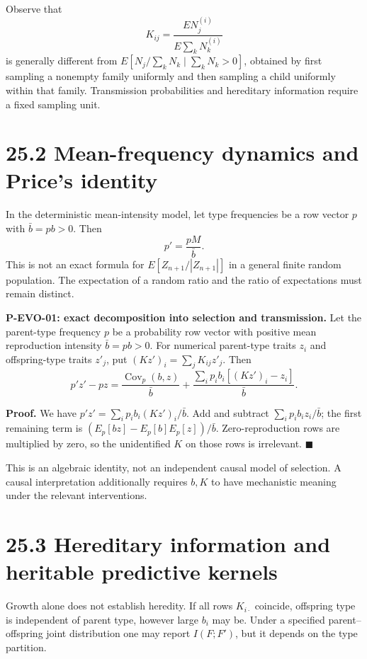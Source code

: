 \documentclass[
  english,
  11pt,
  oneside]{book}
\newcounter{none} %
\begin{document}
Observe that \[K_{ij}=\frac{EN_j^{(i)}}{E\sum_kN_k^{(i)}}\] is generally different from \(E[N_j/\sum_kN_k\mid\sum_kN_k>0]\), obtained by first sampling a nonempty family uniformly and then sampling a child uniformly within that family. Transmission probabilities and hereditary information require a fixed sampling unit.

\section{25.2 Mean-frequency dynamics and Price's identity}\label{mean-frequency-dynamics-and-prices-identity}

In the deterministic mean-intensity model, let type frequencies be a row vector \(p\) with \(\bar b=pb>0\). Then \[p'=\frac{pM}{\bar b}.\] This is not an exact formula for \(E[Z_{n+1}/|Z_{n+1}|]\) in a general finite random population. The expectation of a random ratio and the ratio of expectations must remain distinct.

\hypertarget{p-evo-01}{}\label{p-evo-01}

\textbf{P-EVO-01: exact decomposition into selection and transmission.} Let the parent-type frequency \(p\) be a probability row vector with positive mean reproduction intensity \(\bar b=pb>0\). For numerical parent-type traits \(z_i\) and offspring-type traits \(z'_j\), put \((Kz')_i=\sum_jK_{ij}z'_j\). Then \[p'z'-pz=
\frac{\operatorname{Cov}_p(b,z)}{\bar b}
+\frac{\sum_i p_ib_i[(Kz')_i-z_i]}{\bar b}.\]

\textbf{Proof.} We have \(p'z'=\sum_i p_ib_i(Kz')_i/\bar b\). Add and subtract \(\sum_i p_ib_iz_i/\bar b\); the first remaining term is \((E_p[bz]-E_p[b]E_p[z])/\bar b\). Zero-reproduction rows are multiplied by zero, so the unidentified \(K\) on those rows is irrelevant. \(\blacksquare\)

This is an algebraic identity, not an independent causal model of selection. A causal interpretation additionally requires \(b,K\) to have mechanistic meaning under the relevant interventions.

\section{25.3 Hereditary information and heritable predictive kernels}\label{hereditary-information-and-heritable-predictive-kernels}

Growth alone does not establish heredity. If all rows \(K_{i\cdot}\) coincide, offspring type is independent of parent type, however large \(b_i\) may be. Under a specified parent--offspring joint distribution one may report \(I(F;F')\), but it depends on the type partition.
\end{document}

